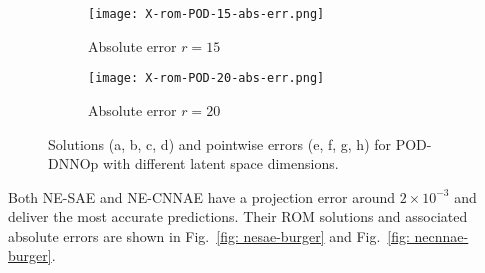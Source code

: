 \begin{figure}[!htb]
\begin{center}
        \begin{subfigure}[b]{0.23\textwidth}
            \begin{center}
                \texttt{[image: X-rom-POD-15-abs-err.png]}
            \end{center}
            \caption{Absolute error $r = 15$}
        \end{subfigure}    
        \begin{subfigure}[b]{0.23\textwidth}
            \begin{center}
                \texttt{[image: X-rom-POD-20-abs-err.png]}
            \end{center}
            \caption{Absolute error $r = 20$}
        \end{subfigure}
     \end{center}
     \caption[Solutions and pointwise errors for POD-DNNOp.]{Solutions (a, b, c, d) and pointwise errors (e, f, g, h) for POD-DNNOp with different latent space dimensions.}
        \label{fig: pod-burger}
\end{figure}
Both NE-SAE and NE-CNNAE have a projection error around $2\times10^{-3}$ and deliver the most accurate predictions. Their ROM solutions and associated absolute errors are shown in Fig.~\ref{fig: nesae-burger} and Fig.~\ref{fig: necnnae-burger}. 

